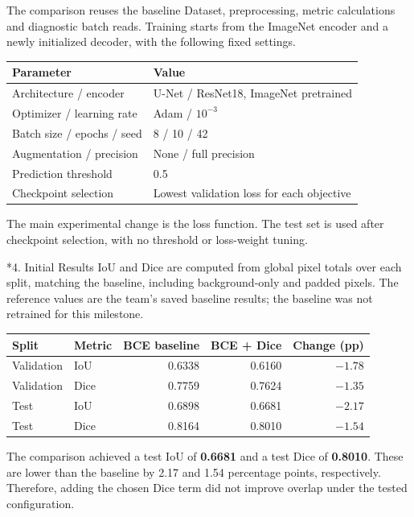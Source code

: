 \documentclass[11pt,a4paper]{article}
\makeatletter
\renewcommand\section{\@startsection{section}{1}{0pt}{1.2ex plus .5ex minus .2ex}{.5ex plus .2ex}{\normalfont\large\bfseries}}
\makeatother
\begin{document}
The comparison reuses the baseline Dataset, preprocessing, metric calculations
and diagnostic batch reads. Training starts from the ImageNet encoder and a
newly initialized decoder, with the following fixed settings.

\begin{center}
\begin{tabular}{ll}
\toprule
\textbf{Parameter} & \textbf{Value} \\
\midrule
Architecture / encoder & U-Net / ResNet18, ImageNet pretrained \\
Optimizer / learning rate & Adam / $10^{-3}$ \\
Batch size / epochs / seed & 8 / 10 / 42 \\
Augmentation / precision & None / full precision \\
Prediction threshold & 0.5 \\
Checkpoint selection & Lowest validation loss for each objective \\
\bottomrule
\end{tabular}
\end{center}
The main experimental change is the loss function. The test set is used after
checkpoint selection, with no threshold or loss-weight tuning.

\newpage
\section*{4. Initial Results}
IoU and Dice are computed from global pixel totals over each split, matching the
baseline, including background-only and padded pixels. The reference values are
the team's saved baseline results; the baseline was not retrained for this milestone.

\begin{center}
\begin{tabular}{llrrr}
\toprule
\textbf{Split} & \textbf{Metric} & \textbf{BCE baseline} & \textbf{BCE + Dice} & \textbf{Change (pp)} \\
\midrule
Validation & IoU & 0.6338 & 0.6160 & $-1.78$ \\
Validation & Dice & 0.7759 & 0.7624 & $-1.35$ \\
Test & IoU & 0.6898 & 0.6681 & $-2.17$ \\
Test & Dice & 0.8164 & 0.8010 & $-1.54$ \\
\bottomrule
\end{tabular}
\end{center}
The comparison achieved a test IoU of \textbf{0.6681} and a test Dice of
\textbf{0.8010}. These are lower than the baseline by 2.17 and 1.54 percentage
points, respectively. Therefore, adding the chosen Dice term did not improve
overlap under the tested configuration.
\end{document}
